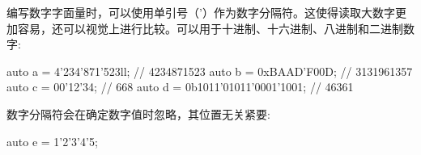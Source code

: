 \begin{myNotic}
编写数字字面量时，可以使用单引号（'）作为数字分隔符。这使得读取大数字更加容易，还可以视觉上进行比较。可以用于十进制、十六进制、八进制和二进制数字:

\begin{cpp}
auto a = 4'234'871'523ll;        // 4234871523
auto b = 0xBAAD'F00D;            // 3131961357
auto c = 00'12'34;               // 668
auto d = 0b1011'01011'0001'1001; // 46361
\end{cpp}

数字分隔符会在确定数字值时忽略，其位置无关紧要:

\begin{cpp}
auto e = 1'2'3'4'5;
\end{cpp}
\end{myNotic}








